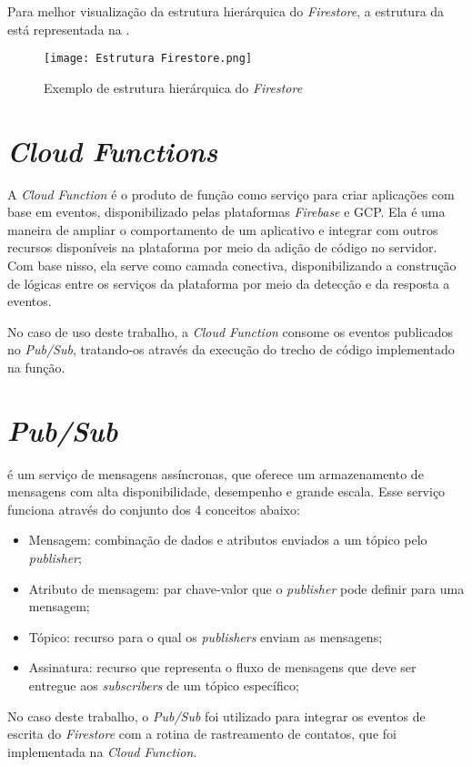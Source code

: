 Para melhor visualização da estrutura hierárquica do \textit{Firestore}, a estrutura da  está representada na .

\begin{figure}[!htb]
    \centering
    \texttt{[image: Estrutura Firestore.png]}
    \caption{Exemplo de estrutura hierárquica do \textit{Firestore}}
    \label{fig:explicacaofirestorecompleto}
\end{figure}

\section{\textit{Cloud Functions}}\label{sec:cloudfunctions}

A \textit{Cloud Function} é o produto de função como serviço para criar aplicações com base em eventos, disponibilizado pelas plataformas \textit{Firebase} e GCP. Ela é uma maneira de ampliar o comportamento de um aplicativo e integrar com outros recursos disponíveis na plataforma por meio da adição de código no servidor. Com base nisso, ela serve como camada conectiva, disponibilizando a construção de lógicas entre os serviços da plataforma por meio da detecção e da resposta a eventos.

No caso de uso deste trabalho, a \textit{Cloud Function} consome os eventos publicados no \textit{Pub/Sub}, tratando-os através da execução do trecho de código implementado na função.

\section{\textit{Pub/Sub}}\label{sec:pubsub}

\textcite{PubSubDocs} é um serviço de mensagens assíncronas, que oferece um armazenamento de mensagens com alta disponibilidade, desempenho e grande escala. Esse serviço funciona através do conjunto dos 4 conceitos abaixo:

\begin{itemize}
    \item Mensagem: combinação de dados e atributos enviados a um tópico pelo \textit{publisher};
    \item Atributo de mensagem: par chave-valor que o \textit{publisher} pode definir para uma mensagem;
    \item Tópico: recurso para o qual os \textit{publishers} enviam as mensagens;
    \item Assinatura: recurso que representa o fluxo de mensagens que deve ser entregue aos \textit{subscribers} de um tópico específico;
\end{itemize}

No caso deste trabalho, o \textit{Pub/Sub} foi utilizado para integrar os eventos de escrita do \textit{Firestore} com a rotina de rastreamento de contatos, que foi implementada na \textit{Cloud Function}.
